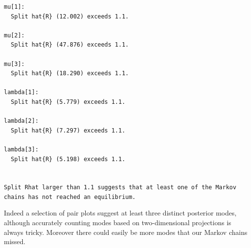 \documentclass[
  letterpaper,
  DIV=11,
  numbers=noendperiod]{scrartcl}
\newenvironment{Shaded}{\begin{snugshade}}{\end{snugshade}}
\newcommand{\AttributeTok}[1]{\textcolor[rgb]{0.40,0.45,0.13}{#1}}
\newcommand{\ConstantTok}[1]{\textcolor[rgb]{0.56,0.35,0.01}{#1}}
\newcommand{\ControlFlowTok}[1]{\textcolor[rgb]{0.00,0.23,0.31}{#1}}
\newcommand{\DecValTok}[1]{\textcolor[rgb]{0.68,0.00,0.00}{#1}}
\newcommand{\FunctionTok}[1]{\textcolor[rgb]{0.28,0.35,0.67}{#1}}
\newcommand{\NormalTok}[1]{\textcolor[rgb]{0.00,0.23,0.31}{#1}}
\newcommand{\OtherTok}[1]{\textcolor[rgb]{0.00,0.23,0.31}{#1}}
\newcommand{\SpecialCharTok}[1]{\textcolor[rgb]{0.37,0.37,0.37}{#1}}
\newcommand{\StringTok}[1]{\textcolor[rgb]{0.13,0.47,0.30}{#1}}
\begin{document}
\begin{Shaded}
\end{Shaded}

\begin{verbatim}
mu[1]:
  Split hat{R} (12.002) exceeds 1.1.

mu[2]:
  Split hat{R} (47.876) exceeds 1.1.

mu[3]:
  Split hat{R} (18.290) exceeds 1.1.

lambda[1]:
  Split hat{R} (5.779) exceeds 1.1.

lambda[2]:
  Split hat{R} (7.297) exceeds 1.1.

lambda[3]:
  Split hat{R} (5.198) exceeds 1.1.


Split Rhat larger than 1.1 suggests that at least one of the Markov
chains has not reached an equilibrium.
\end{verbatim}

Indeed a selection of pair plots suggest at least three distinct
posterior modes, although accurately counting modes based on
two-dimensional projections is always tricky. Moreover there could
easily be more modes that our Markov chains missed.

\begin{Shaded}
\end{Shaded}
\end{document}
